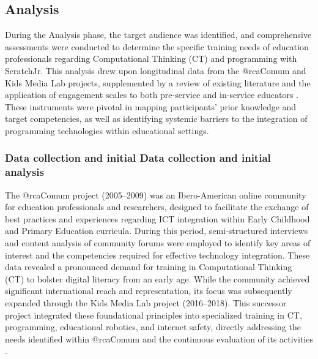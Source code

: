 \documentclass[english]{textolivre}
\begin{document}
\subsection{Analysis}\label{sec-titulo}
During the Analysis phase, the target audience was identified, and comprehensive assessments were conducted to determine the specific training needs of education professionals regarding Computational Thinking (CT) and programming with ScratchJr. This analysis drew upon longitudinal data from the @rcaComum \cite{mirandapinto2009processos} and Kids Media Lab projects, supplemented by a review of existing literature and the application of engagement scales to both pre-service and in-service educators \cite{mirandapinto2019programacion,mirandapinto2019aprender}. These instruments were pivotal in mapping participants' prior knowledge and target competencies, as well as identifying systemic barriers to the integration of programming technologies within educational settings.

\subsubsection{Data collection and initial Data collection and initial analysis}\label{sec-autores}
The @rcaComum project (2005–2009) was an Ibero-American online community for education professionals and researchers, designed to facilitate the exchange of best practices and experiences regarding ICT integration within Early Childhood and Primary Education curricula. During this period, semi-structured interviews and content analysis of community forums \cite{mirandapinto2009processos} were employed to identify key areas of interest and the competencies required for effective technology integration. These data revealed a pronounced demand for training in Computational Thinking (CT) to bolster digital literacy from an early age. While the community achieved significant international reach and representation, its focus was subsequently expanded through the Kids Media Lab project (2016–2018). This successor project integrated these foundational principles into specialized training in CT, programming, educational robotics, and internet safety, directly addressing the needs identified within @rcaComum and the continuous evaluation of its activities \cite{ibanez2018aspectos,mirandapinto2012ambientes,mirandapinto2010colaboracion}.
\end{document}
